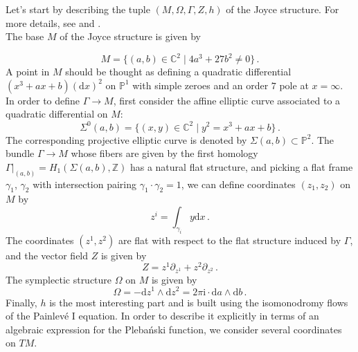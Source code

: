 \documentclass{article}
\theoremstyle{definition}
\numberwithin{equation}{section}
\begin{document}
Let's start by describing the tuple $(M,\Omega,\Gamma,Z,h)$ of the Joyce structure. For more details, see \cite{BridgelandOsc} and \cite[Section  9]{TwistorJoyce}. \\

The base $M$ of the Joyce structure is given by

\begin{equation*}
    M=\{(a,b)\in \mathbb{C}^2 \; | \; 4a^3+27b^2\neq 0\}\,.
\end{equation*}
A point in $M$
 should be thought as defining a quadratic differential $(x^3+ax+b)(\mathrm{d}x)^2$ on $\mathbb{P}^1$ with simple zeroes and an order $7$ pole at $x=\infty$. In order to define $\Gamma \to M$, first consider the affine elliptic curve associated to a quadratic differential on $M$:
 \begin{equation}
     \Sigma^{0}(a,b)=\{(x,y)\in \mathbb{C}^2 \; | \; y^2=x^3+ax+b\}\,.
 \end{equation}
 The corresponding projective elliptic curve is denoted by $\Sigma(a,b)\subset \mathbb{P}^2$. The bundle $\Gamma\to M$ whose fibers are given by the first homology $\Gamma|_{(a,b)}=H_1(\Sigma(a,b),\mathbb{Z})$ has a natural flat structure, and picking a flat frame $\gamma_1$, $\gamma_2$ with intersection pairing $\gamma_1\cdot \gamma_2=1$, we can define coordinates $(z_1,z_2)$ on $M$
 by  
 \begin{equation*}
    z^i=\int_{\gamma_i}y\mathrm{d}x\,.  
 \end{equation*}
The coordinates $(z^1,z^2)$ are flat with respect to the flat structure induced by $\Gamma$, and the vector field $Z$ is given by \begin{equation*}
    Z=z^1\partial_{z^1}+z^2\partial_{z^2}\,.
\end{equation*} The symplectic structure $\Omega$ on $M$ is given by
\begin{equation}\label{sympconv}
    \Omega=-\mathrm{d}z^1\wedge \mathrm{d}z^2=2\pi \mathrm{i}\cdot \mathrm{d}a\wedge \mathrm{d}b\,.
\end{equation}
Finally, $h$ is the most interesting part and is built using the isomonodromy flows of the Painlev\'e I equation. In order to describe it explicitly in terms of an algebraic expression for the Pleba\'nski function, we consider several coordinates on $TM$.\\
\end{document}
